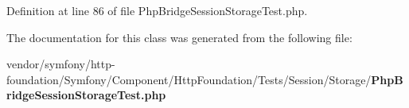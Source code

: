 Definition at line 86 of file Php\+Bridge\+Session\+Storage\+Test.\+php.



The documentation for this class was generated from the following file\+:\begin{DoxyCompactItemize}
\item 
vendor/symfony/http-\/foundation/\+Symfony/\+Component/\+Http\+Foundation/\+Tests/\+Session/\+Storage/{\bf Php\+Bridge\+Session\+Storage\+Test.\+php}\end{DoxyCompactItemize}
